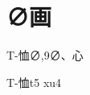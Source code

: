 
\section*{∅画}

\begin{Entry}{T-恤}{∅,9}{∅、⼼}
  \begin{Phonetics}{T-恤}{t5 xu4}
  \end{Phonetics}
\end{Entry}


